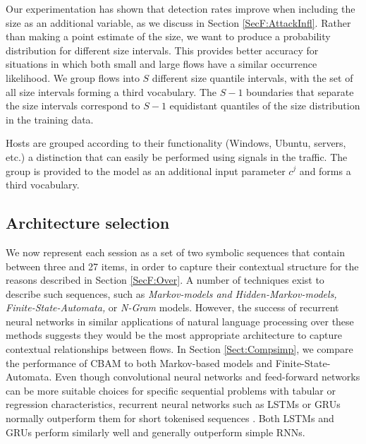 Our experimentation has shown that detection rates improve when including the size as an additional variable, as we discuss in Section \ref{SecF:AttackInfl}. Rather than making a point estimate of the size, we want to produce a probability distribution for different size intervals. This provides better accuracy for situations in which both small and large flows have a similar occurrence likelihood. We group flows into $S$ different size quantile intervals, with the set of all size intervals forming a third vocabulary. The $S-1$ boundaries that separate the size intervals correspond to $S-1$ equidistant quantiles of the size distribution in the training data.

Hosts are grouped according to their functionality (Windows, Ubuntu, servers, etc.) a distinction that can easily be performed using signals in the traffic.  %
The group is provided to the model as an additional input parameter $c^j$ and forms a third vocabulary. 


\subsection{Architecture selection}


We now represent each session as a set of two symbolic sequences that contain between three and 27 items, in order to capture their contextual structure for the reasons described in Section \ref{SecF:Over}. A number of techniques exist to describe such sequences, such as \textit{Markov-models and Hidden-Markov-models, Finite-State-Automata,} or \textit{N-Gram} models. However, the success of recurrent neural networks in similar applications of natural language processing over these methods suggests they would be the most appropriate architecture to capture contextual relationships between flows. In Section \ref{Sect:Compsimp}, we compare the performance of CBAM to both Markov-based models and Finite-State-Automata. Even though convolutional neural networks and feed-forward networks can be more suitable choices for specific sequential problems with tabular or regression characteristics, recurrent neural networks such as LSTMs or GRUs normally outperform them for short tokenised sequences \cite{yin2017comparative}. Both LSTMs and GRUs perform similarly well and generally outperform simple RNNs.





